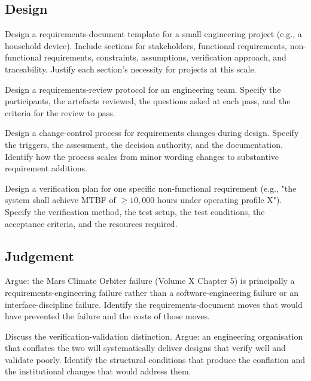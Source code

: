 \subsection*{Design}

\begin{exercise}
Design a requirements-document template for a small engineering project (e.g., a household device). Include sections for stakeholders, functional requirements, non-functional requirements, constraints, assumptions, verification approach, and traceability. Justify each section's necessity for projects at this scale.
\end{exercise}

\begin{exercise}
Design a requirements-review protocol for an engineering team. Specify the participants, the artefacts reviewed, the questions asked at each pass, and the criteria for the review to pass.
\end{exercise}

\begin{exercise}
Design a change-control process for requirements changes during design. Specify the triggers, the assessment, the decision authority, and the documentation. Identify how the process scales from minor wording changes to substantive requirement additions.
\end{exercise}

\begin{exercise}
Design a verification plan for one specific non-functional requirement (e.g., "the system shall achieve MTBF of $\geq 10{,}000$ hours under operating profile X"). Specify the verification method, the test setup, the test conditions, the acceptance criteria, and the resources required.
\end{exercise}

\subsection*{Judgement}

\begin{exercise}
Argue: the Mars Climate Orbiter failure (Volume X Chapter 5) is principally a requirements-engineering failure rather than a software-engineering failure or an interface-discipline failure. Identify the requirements-document moves that would have prevented the failure and the costs of those moves.
\end{exercise}

\begin{exercise}
Discuss the verification-validation distinction. Argue: an engineering organisation that conflates the two will systematically deliver designs that verify well and validate poorly. Identify the structural conditions that produce the conflation and the institutional changes that would address them.
\end{exercise}

